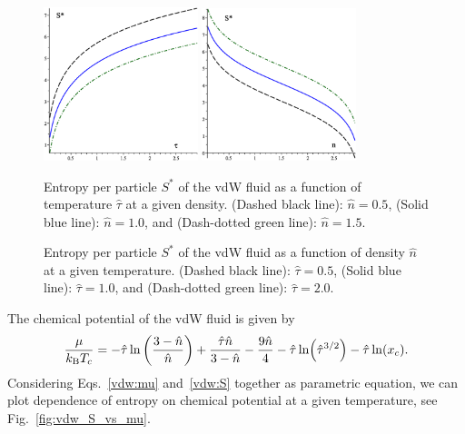 \documentclass[12pt]{article}
\numberwithin{equation}{section}
\begin{document}
	\begin{figure}[htbp]
		\includegraphics[width=0.4\textwidth,angle=0]{vdw_S_vs_t}
		\hfill
		\includegraphics[width=0.4\textwidth,angle=0]{vdw_S_vs_n}
		\\
		\parbox{0.45\textwidth}{\caption{\label{fig:vdw_S_vs_t} Entropy per particle $S^{*}$ of the vdW fluid as a function of temperature $\hat{\tau}$ at a given density. (Dashed black line): $\hat{n}=0.5$, (Solid blue line): $\hat{n}=1.0$, and (Dash-dotted green line): $\hat{n}=1.5$.}}
		\hfill
		\parbox{0.45\textwidth}{\caption{\label{fig:vdw_S_vs_n} Entropy per particle $S^{*}$ of the vdW fluid as a function of density $\hat{n}$ at a given temperature. (Dashed black line): $\hat{\tau}=0.5$, (Solid blue line): $\hat{\tau}=1.0$, and (Dash-dotted green line): $\hat{\tau}=2.0$.}}
	\end{figure}
	
	The chemical potential of the vdW fluid is given by~\cite[(70c)]{Johnston14}
	\begin{equation}
		\label{vdw:mu}
		\frac{\mu}{k_{\rm B}T_c} = -\hat{\tau} \ln \left(\frac{3-\hat{n}}{\hat{n}}\right) + \frac{\hat{\tau}\hat{n}}{3-\hat{n}} - \frac{9\hat{n}}{4} - \hat{\tau}\ln(\hat{\tau}^{3/2}) - \hat{\tau}\ln(x_c).
	\end{equation}
	Considering Eqs.~\eqref{vdw:mu} and~\eqref{vdw:S} together as parametric equation, we can plot dependence of entropy on chemical potential at a given temperature, see Fig.~\ref{fig:vdw_S_vs_mu}.
	
\end{document}
